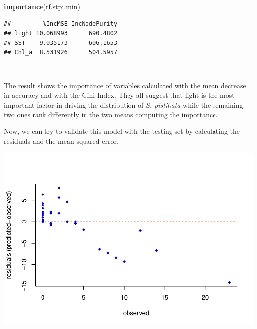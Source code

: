 \documentclass[
]{article}
\newenvironment{Shaded}{\begin{snugshade}}{\end{snugshade}}
\newcommand{\CommentTok}[1]{\textcolor[rgb]{0.56,0.35,0.01}{\textit{#1}}}
\newcommand{\DataTypeTok}[1]{\textcolor[rgb]{0.13,0.29,0.53}{#1}}
\newcommand{\DecValTok}[1]{\textcolor[rgb]{0.00,0.00,0.81}{#1}}
\newcommand{\KeywordTok}[1]{\textcolor[rgb]{0.13,0.29,0.53}{\textbf{#1}}}
\newcommand{\NormalTok}[1]{#1}
\newcommand{\OperatorTok}[1]{\textcolor[rgb]{0.81,0.36,0.00}{\textbf{#1}}}
\newcommand{\StringTok}[1]{\textcolor[rgb]{0.31,0.60,0.02}{#1}}
\begin{document}
\begin{Shaded}
\begin{Highlighting}[]
\KeywordTok{importance}\NormalTok{(rf.stpi.min)}
\end{Highlighting}
\end{Shaded}

\begin{verbatim}
##         %IncMSE IncNodePurity
## light 10.068993      690.4802
## SST    9.035173      606.1653
## Chl_a  8.531926      504.5957
\end{verbatim}

~

The result shows the importance of variables calculated with the mean
decrease in accuracy and with the Gini Index. They all suggest that
light is the most important factor in driving the distribution of
\emph{S. pistillata} while the remaining two ones rank differently in
the two means computing the importance.

Now, we can try to validate this model with the testing set by
calculating the residuals and the mean squared error.

\begin{Shaded}
\end{Shaded}

\includegraphics{index_files/figure-latex/unnamed-chunk-11-1.pdf}
\end{document}
